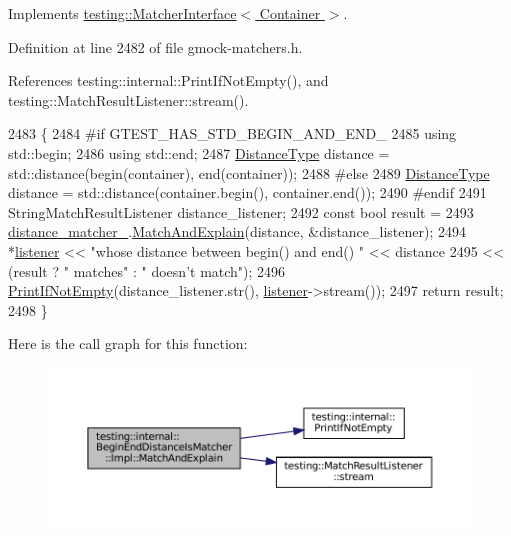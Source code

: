 Implements \hyperlink{classtesting_1_1MatcherInterface_a296b43607cd99d60365f0e6a762777cf}{testing\+::\+Matcher\+Interface$<$ Container $>$}.



Definition at line 2482 of file gmock-\/matchers.\+h.



References testing\+::internal\+::\+Print\+If\+Not\+Empty(), and testing\+::\+Match\+Result\+Listener\+::stream().


\begin{DoxyCode}
2483                                                                       \{
2484 \textcolor{preprocessor}{#if GTEST\_HAS\_STD\_BEGIN\_AND\_END\_}
2485       \textcolor{keyword}{using} std::begin;
2486       \textcolor{keyword}{using} std::end;
2487       \hyperlink{classtesting_1_1internal_1_1BeginEndDistanceIsMatcher_1_1Impl_a10d901c49e2793dae6bcce6fa1a4e9fe}{DistanceType} distance = std::distance(begin(container), end(container));
2488 \textcolor{preprocessor}{#else}
2489       \hyperlink{classtesting_1_1internal_1_1BeginEndDistanceIsMatcher_1_1Impl_a10d901c49e2793dae6bcce6fa1a4e9fe}{DistanceType} distance = std::distance(container.begin(), container.end());
2490 \textcolor{preprocessor}{#endif}
2491       StringMatchResultListener distance\_listener;
2492       \textcolor{keyword}{const} \textcolor{keywordtype}{bool} result =
2493           \hyperlink{classtesting_1_1internal_1_1BeginEndDistanceIsMatcher_1_1Impl_acc8d923e6901fa9c75bf76825b2baa6b}{distance\_matcher\_}.\hyperlink{classtesting_1_1internal_1_1MatcherBase_a08429a6d7e7d330de4a4eb4e272105a7}{MatchAndExplain}(distance, &distance\_listener);
2494       *\hyperlink{namespaceinteractive__marker_a0e579ab555212bb5e2c9f8a675b7618a}{listener} << \textcolor{stringliteral}{"whose distance between begin() and end() "} << distance
2495                 << (result ? \textcolor{stringliteral}{" matches"} : \textcolor{stringliteral}{" doesn't match"});
2496       \hyperlink{namespacetesting_1_1internal_afa4cd5d7933878d6d820b32c87bb2767}{PrintIfNotEmpty}(distance\_listener.str(), \hyperlink{namespaceinteractive__marker_a0e579ab555212bb5e2c9f8a675b7618a}{listener}->stream());
2497       \textcolor{keywordflow}{return} result;
2498     \}
\end{DoxyCode}
Here is the call graph for this function\+:
\nopagebreak
\begin{figure}[H]
\begin{center}
\leavevmode
\includegraphics[width=350pt]{classtesting_1_1internal_1_1BeginEndDistanceIsMatcher_1_1Impl_aa7bda59eae256018247699b0baa285c9_cgraph}
\end{center}
\end{figure}



